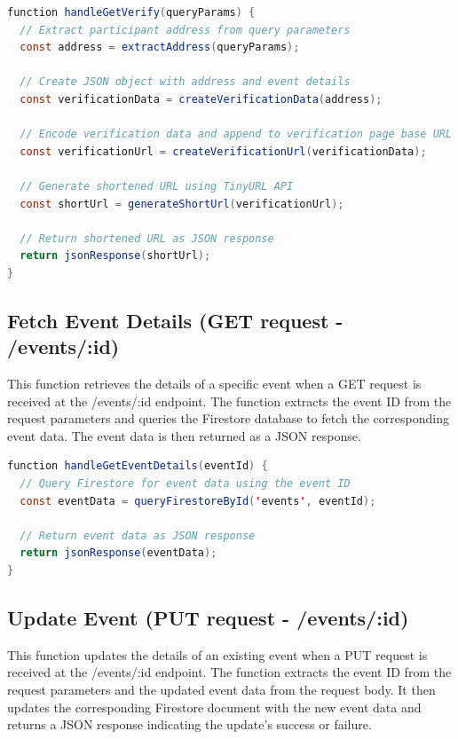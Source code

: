 \begin{lstlisting}[language=Java, name={Verify Participant Function}, label={sc:verifyParticipant}]
function handleGetVerify(queryParams) {
  // Extract participant address from query parameters
  const address = extractAddress(queryParams);

  // Create JSON object with address and event details
  const verificationData = createVerificationData(address);

  // Encode verification data and append to verification page base URL
  const verificationUrl = createVerificationUrl(verificationData);

  // Generate shortened URL using TinyURL API
  const shortUrl = generateShortUrl(verificationUrl);

  // Return shortened URL as JSON response
  return jsonResponse(shortUrl);
}
\end{lstlisting}

\subsection{Fetch Event Details (GET request - /events/:id)}
This function retrieves the details of a specific event when a GET request is received at the /events/:id endpoint. The function extracts the event ID from the request parameters and queries the Firestore database to fetch the corresponding event data. The event data is then returned as a JSON response.

\begin{lstlisting}[language=Java, name={Fetch Event Details Function}, label={sc:fetchEventDetails}]
function handleGetEventDetails(eventId) {
  // Query Firestore for event data using the event ID
  const eventData = queryFirestoreById('events', eventId);

  // Return event data as JSON response
  return jsonResponse(eventData);
}
\end{lstlisting}

\subsection{Update Event (PUT request - /events/:id)}
This function updates the details of an existing event when a PUT request is received at the /events/:id endpoint. The function extracts the event ID from the request parameters and the updated event data from the request body. It then updates the corresponding Firestore document with the new event data and returns a JSON response indicating the update's success or failure.

